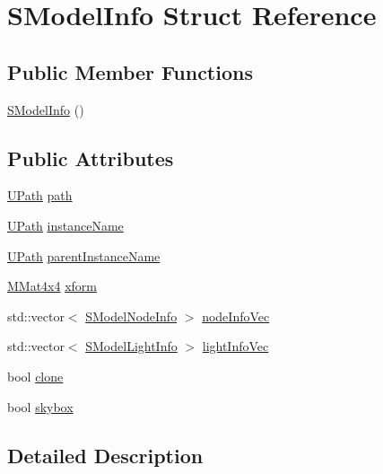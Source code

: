 \hypertarget{struct_s_model_info}{
\section{SModelInfo Struct Reference}
\label{struct_s_model_info}
}
\subsection*{Public Member Functions}
\begin{CompactItemize}
\item 
\hyperlink{struct_s_model_info_d590ff26bd110db901f119416d0ecf04}{SModelInfo} ()
\end{CompactItemize}
\subsection*{Public Attributes}
\begin{CompactItemize}
\item 
\hyperlink{class_u_path}{UPath} \hyperlink{struct_s_model_info_420add05541cbfe326890c918be61265}{path}
\item 
\hyperlink{class_u_path}{UPath} \hyperlink{struct_s_model_info_e6ba1ebcc415ac7a794853a0910a32d0}{instanceName}
\item 
\hyperlink{class_u_path}{UPath} \hyperlink{struct_s_model_info_95660e555e8990625772b3f5744639fd}{parentInstanceName}
\item 
\hyperlink{class_m_mat4x4}{MMat4x4} \hyperlink{struct_s_model_info_4938e01ec384c259e954268a7f4236cc}{xform}
\item 
std::vector$<$ \hyperlink{struct_s_model_node_info}{SModelNodeInfo} $>$ \hyperlink{struct_s_model_info_cd0eda8de59d6aa049d5afaa851a1d82}{nodeInfoVec}
\item 
std::vector$<$ \hyperlink{struct_s_model_light_info}{SModelLightInfo} $>$ \hyperlink{struct_s_model_info_8528cbebf3292b977c3cd481ef32a5ac}{lightInfoVec}
\item 
bool \hyperlink{struct_s_model_info_cf9ec13cd56151333419dbcc25661151}{clone}
\item 
bool \hyperlink{struct_s_model_info_07a5eabdc7679e76a537d055d1263fe8}{skybox}
\end{CompactItemize}


\subsection{Detailed Description}


